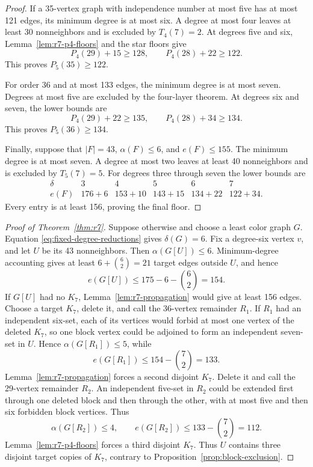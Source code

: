 \documentclass[11pt,reqno,a4paper]{amsart}
\theoremstyle{definition}
\theoremstyle{remark}
\begin{document}
\begin{proof}
If a 35-vertex graph with independence number at most five has at most
121 edges, its minimum degree is at most six. A degree at most four
leaves at least 30 nonneighbors and is excluded by $T_4(7)=2$. At
degrees five and six, Lemma~\ref{lem:r7-p4-floors} and the star floors
give
\[
 P_4(29)+15\geq128,
 \qquad P_4(28)+22\geq122.
\]
This proves $P_5(35)\geq122$.

For order 36 and at most 133 edges, the minimum degree is at most seven.
Degrees at most five are excluded by the four-layer theorem. At degrees
six and seven, the lower bounds are
\[
 P_4(29)+22\geq135,
 \qquad P_4(28)+34\geq134.
\]
This proves $P_5(36)\geq134$.

Finally, suppose that $|F|=43$, $\alpha(F)\leq6$, and
$e(F)\leq155$. The minimum degree is at most seven. A degree at most two
leaves at least 40 nonneighbors and is excluded by $T_5(7)=5$. For
degrees three through seven the lower bounds are
\[
\begin{array}{c|ccccc}
\delta&3&4&5&6&7\\ \hline
e(F)&176+6&153+10&143+15&134+22&122+34.
\end{array}
\]
Every entry is at least 156, proving the final floor.
\end{proof}

\begin{proof}[Proof of Theorem~\ref{thm:r7}]
Suppose otherwise and choose a least color graph $G$. Equation
\eqref{eq:fixed-degree-reductions} gives $\delta(G)=6$. Fix a
degree-six vertex $v$, and let $U$ be its 43 nonneighbors. Then
$\alpha(G[U])\leq6$. Minimum-degree accounting gives at least
$6+\binom62=21$ target edges outside $U$, and hence
\[
 e(G[U])\leq175-6-\binom62=154.
\]
If $G[U]$ had no $K_7$, Lemma~\ref{lem:r7-propagation} would give at
least 156 edges. Choose a target $K_7$, delete it, and call the
36-vertex remainder $R_1$. If $R_1$ had an independent six-set, each
of its vertices would forbid at most one vertex of the deleted $K_7$, so
one block vertex could be adjoined to form an independent seven-set in
$U$. Hence $\alpha(G[R_1])\leq5$, while
\[
 e(G[R_1])\leq154-\binom72=133.
\]
Lemma~\ref{lem:r7-propagation} forces a second disjoint $K_7$. Delete
it and call the 29-vertex remainder $R_2$. An independent five-set in
$R_2$ could be extended first through one deleted block and then through
the other, with at most five and then six forbidden block vertices. Thus
\[
 \alpha(G[R_2])\leq4,
 \qquad e(G[R_2])\leq133-\binom72=112.
\]
Lemma~\ref{lem:r7-p4-floors} forces a third disjoint $K_7$. Thus $U$
contains three disjoint target copies of $K_7$, contrary to
Proposition~\ref{prop:block-exclusion}.
\end{proof}
\end{document}
